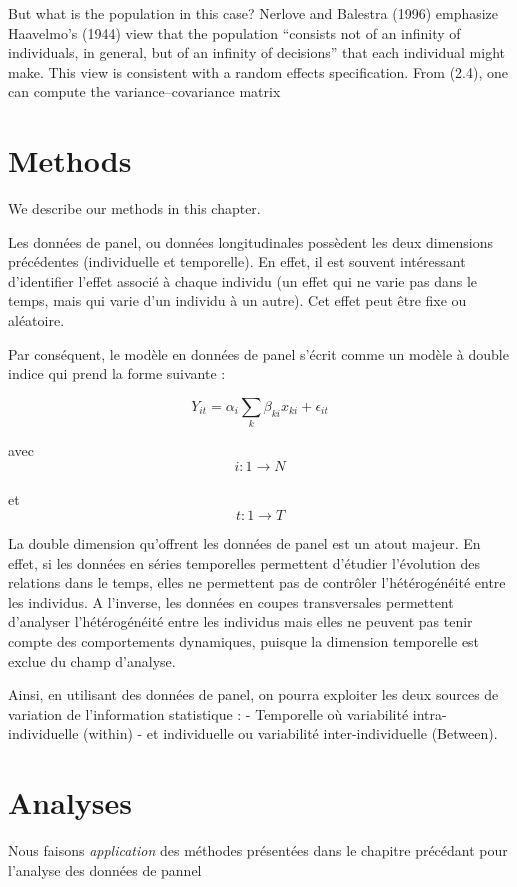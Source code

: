\documentclass[
]{book}
\begin{document}
But what is the population in this case? Nerlove and Balestra (1996) emphasize Haavelmo's
(1944) view that the population ``consists not of an infinity of individuals, in general, but of an
infinity of decisions'' that each individual might make. This view is consistent with a random
effects specification. From (2.4), one can compute the variance--covariance matrix

\hypertarget{methods}{%
\chapter{Methods}\label{methods}}

We describe our methods in this chapter.

Les données de panel, ou données longitudinales possèdent les deux dimensions précédentes (individuelle et temporelle). En effet, il est souvent intéressant d'identifier l'effet associé à chaque individu (un effet qui ne varie pas dans le temps, mais qui varie d'un individu à un autre). Cet effet peut être fixe ou aléatoire.

Par conséquent, le modèle en données de panel s'écrit comme un modèle à double indice qui prend la forme suivante :

\[ Y_{it}= \alpha_i\sum_{k}\beta_{ki}x_{ki}+ \epsilon_{it} \]

avec
\[ i:1 \rightarrow N \]\\
et
\[ t:1 \rightarrow T \]

La double dimension qu'offrent les données de panel est un atout majeur. En effet, si les données en séries temporelles permettent d'étudier l'évolution des relations dans le temps, elles ne permettent pas de contrôler l'hétérogénéité entre les individus. A l'inverse, les données en coupes transversales permettent d'analyser l'hétérogénéité entre les individus mais elles ne peuvent pas tenir compte des comportements dynamiques, puisque la dimension temporelle est exclue du champ d'analyse.

Ainsi, en utilisant des données de panel, on pourra exploiter les deux sources de variation de l'information statistique :
- Temporelle où variabilité intra-individuelle (within)
- et individuelle ou variabilité inter-individuelle (Between).

\hypertarget{analyses}{%
\chapter{Analyses}\label{analyses}}

Nous faisons \emph{application} des méthodes présentées dans le chapitre précédant pour l'analyse des données de pannel
\end{document}
